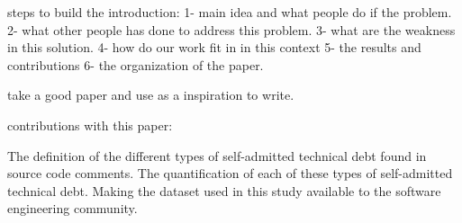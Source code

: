 steps to build the introduction:
1- main idea and what people do if the problem. 
2- what other people has done to address this problem. 
3- what are the weakness in this solution. 
4- how do our work fit in in this context
5- the results and contributions 
6- the organization of the paper. 

take a good paper and use as a inspiration to write. 


contributions with this paper:

The definition of the different types of self-admitted technical debt found in source code comments.
The quantification of each of these types of self-admitted technical debt.
Making the dataset used in this study available to the software engineering community.  